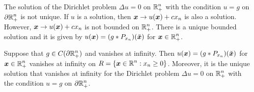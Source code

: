 \begin{rmk}
The solution of the Dirichlet problem $\Delta u=0$ on
$\displaystyle \mathbb{R}^n_+$ with
the condition $u=g$ on $\displaystyle \partial \mathbb{R}^n_+$ is not unique.
If $u$ is a solution, then ${\bm{x}} \rightarrow u({\bm{x}})+cx_n$ is also a
solution.  However, ${\bm{x}} \rightarrow u({\bm{x}})+cx_n$ is not
bounded on $\displaystyle \mathbb{R}^n_+$.  There is a unique bounded
solution and it is given by
$u({\bm{x}}) = (g \ast P_{x_n})(\breve{{\bm{x}}})$ for
$\displaystyle {\bm{x}}\in\mathbb{R}^n_+$.
\end{rmk}

\begin{theorem}
Suppose that $\displaystyle g \in C(\partial \mathbb{R}^n_+)$ and vanishes at infinity.
Then $u({\bm{x}}) = (g \ast P_{x_n})(\breve{{\bm{x}}})$ for
$\displaystyle {\bm{x}} \in \mathbb{R}^n_+$ vanishes at infinity on
$\displaystyle R = \left\{ {\bm{x}} \in \mathbb{R}^n : x_n \geq 0 \right\}$.
Moreover, it is the unique solution that vanishes at infinity for the
Dirichlet problem $\Delta u=0$ on $\displaystyle \mathbb{R}^n_+$ with the
condition $u=g$ on $\displaystyle \partial \mathbb{R}^n_+$.
\end{theorem}

